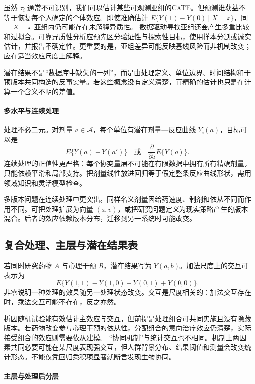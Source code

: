 虽然 $\tau_i$ 通常不可识别，我们可以估计某些可观测亚组的CATE。但预测谁获益不等于恢复每个人确定的个体效应。即使准确估计 $E\{Y(1)-Y(0)\mid X=x\}$，同一 $X=x$ 亚组内仍可能存在未解释异质性。
数据驱动寻找亚组还会产生多重比较和过拟合。可靠异质性分析应预先区分验证性与探索性目标，使用样本分割或诚实估计，并报告不确定性。更重要的是，亚组差异可能反映基线风险而非机制改变；应在适当效应尺度上解释。

\begin{keypoint}
潜在结果不是“数据库中缺失的一列”，而是由处理定义、单位边界、时间结构和干预版本共同构造的反事实量。若这些概念没有定义清楚，再精确的估计也只是在计算一个含义不明的差值。
\end{keypoint}

\paragraph{多水平与连续处理}

处理不必二元。对剂量 $a\in\mathcal A$，每个单位有潜在剂量---反应曲线 $Y_i(a)$，目标可以是
\[
E\{Y(a)-Y(a')\}
\quad\text{或}\quad
\frac{\partial}{\partial a}E\{Y(a)\}.
\]
连续处理的正值性更严格：每个协变量层不可能在有限数据中拥有所有精确剂量，只能依赖平滑和局部支持。把剂量线性放进回归等于假定整条反应曲线形状，需用领域知识和灵活模型检查。

多版本问题在连续处理中更突出。同样名义剂量因给药速度、制剂和依从不同而作用不同。可把处理扩展为向量 $(a,v)$，或把研究问题定义为现实策略产生的版本混合。后者的效应依赖版本分布，迁移到另一系统时可能改变。

\subsection{复合处理、主层与潜在结果表}

若同时研究药物 $A$ 与心理干预 $B$，潜在结果写为 $Y(a,b)$。加法尺度上的交互可表示为
\[
E\{Y(1,1)-Y(1,0)-Y(0,1)+Y(0,0)\}.
\]
非零说明一种处理的效果随另一处理状态改变。交互是尺度相关的：加法交互存在时，乘法交互可能不存在，反之亦然。

析因随机试验能有效估计主效应与交互，但前提是处理组合可共同实施且没有隐藏版本。若药物改变参与心理干预的依从性，分配组合的意向治疗效应仍清楚，实际接受组合的效应则需要依从建模。
“协同机制”与统计交互也不相同。机制上两因素共同必要可能在某尺度表现强交互，但人群背景分布、结果阈值和测量会改变统计形态。不能仅凭回归乘积项显著就断言发现生物协同。

\paragraph{主层与处理后分层}

